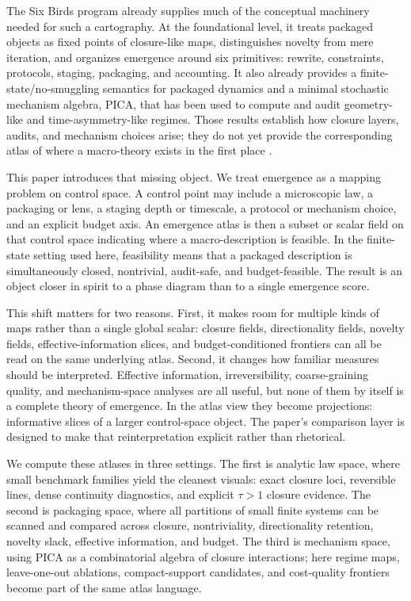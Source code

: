 \documentclass[11pt]{article}
\theoremstyle{definition}
\begin{document}
The Six Birds program already supplies much of the conceptual machinery needed for such a cartography. At the foundational level, it treats packaged objects as fixed points of closure-like maps, distinguishes novelty from mere iteration, and organizes emergence around six primitives: rewrite, constraints, protocols, staging, packaging, and accounting. It also already provides a finite-state/no-smuggling semantics for packaged dynamics and a minimal stochastic mechanism algebra, PICA, that has been used to compute and audit geometry-like and time-asymmetry-like regimes. Those results establish how closure layers, audits, and mechanism choices arise; they do not yet provide the corresponding atlas of where a macro-theory exists in the first place \cite{tsiokos2026_foundations,tsiokos2026_lay,tsiokos2026_create}.

This paper introduces that missing object. We treat emergence as a mapping problem on control space. A control point may include a microscopic law, a packaging or lens, a staging depth or timescale, a protocol or mechanism choice, and an explicit budget axis. An emergence atlas is then a subset or scalar field on that control space indicating where a macro-description is feasible. In the finite-state setting used here, feasibility means that a packaged description is simultaneously closed, nontrivial, audit-safe, and budget-feasible. The result is an object closer in spirit to a phase diagram than to a single emergence score.

This shift matters for two reasons. First, it makes room for multiple kinds of maps rather than a single global scalar: closure fields, directionality fields, novelty fields, effective-information slices, and budget-conditioned frontiers can all be read on the same underlying atlas. Second, it changes how familiar measures should be interpreted. Effective information, irreversibility, coarse-graining quality, and mechanism-space analyses are all useful, but none of them by itself is a complete theory of emergence. In the atlas view they become projections: informative slices of a larger control-space object. The paper’s comparison layer is designed to make that reinterpretation explicit rather than rhetorical.

We compute these atlases in three settings. The first is analytic law space, where small benchmark families yield the cleanest visuals: exact closure loci, reversible lines, dense continuity diagnostics, and explicit $\tau>1$ closure evidence. The second is packaging space, where all partitions of small finite systems can be scanned and compared across closure, nontriviality, directionality retention, novelty slack, effective information, and budget. The third is mechanism space, using PICA as a combinatorial algebra of closure interactions; here regime maps, leave-one-out ablations, compact-support candidates, and cost-quality frontiers become part of the same atlas language.
\end{document}
